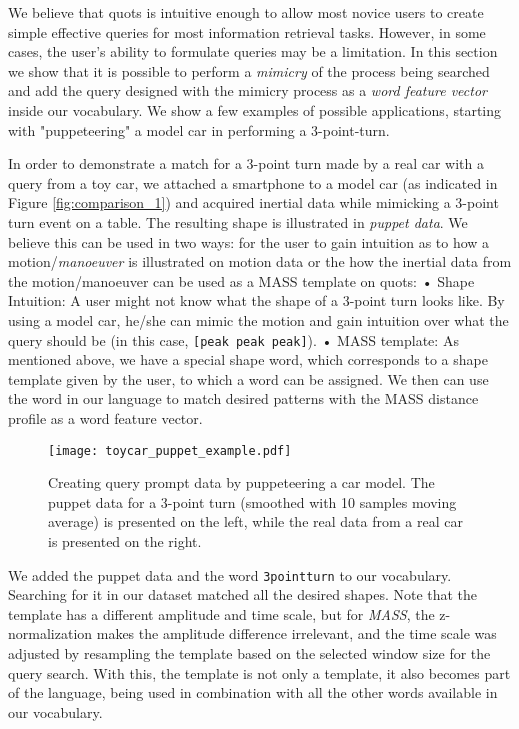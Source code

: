 We believe that \gls{quots} is intuitive enough to allow most novice users to create simple effective queries for most information retrieval tasks.  However, in some cases, the user’s ability to formulate queries may be a limitation. In this section we show that it is possible to perform a \textit{mimicry} of the process being searched and add the query designed with the mimicry process as a \textit{word feature vector} inside our vocabulary. We show a few examples of possible applications, starting with "puppeteering" a model car in performing a 3-point-turn.
\par
In order to demonstrate a match for a 3-point turn made by a real car with a query from a toy car, we attached a smartphone to a model car (as indicated in Figure \ref{fig:comparison_1}) and acquired inertial data while mimicking a 3-point turn event on a table. The resulting shape is illustrated in \textit{puppet data}. We believe this can be used in two ways: for the user to gain intuition as to how a motion/\textit{manoeuver} is illustrated on motion data or the how the inertial data from the motion/manoeuver can be used as a MASS template on \gls{quots}: 
•	Shape Intuition: A user might not know what the shape of a 3-point turn looks like. By using a model car, he/she can mimic the motion and gain intuition over what the query should be (in this case, \texttt{[peak peak peak]}). 
•	MASS template: As mentioned above, we have a special shape word, which corresponds to a shape template given by the user, to which a word can be assigned. We then can use the word in our language to match desired patterns with the MASS distance profile as a word feature vector.  

\begin{figure}[h]
    \centering
    \texttt{[image: toycar\_puppet\_example.pdf]}
    \caption{Creating query prompt data by puppeteering a car model. The puppet data for a 3-point turn (smoothed with 10 samples moving average) is presented on the left, while the real data from a real car is presented on the right. }
    \label{fig:puppeteering}
\end{figure}

We added the puppet data and the word \texttt{3pointturn} to our vocabulary. Searching for it in our dataset matched all the desired shapes. Note that the template has a different amplitude and time scale, but for \textit{MASS}, the z-normalization makes the amplitude difference irrelevant, and the time scale was adjusted by resampling the template based on the selected window size for the query search. With this, the template is not only a template, it also becomes part of the language, being used in combination with all the other words available in our vocabulary.



